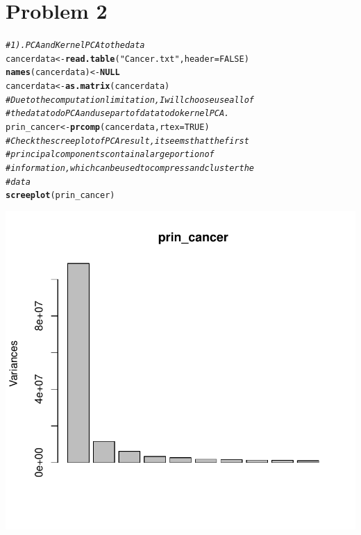 \documentclass{article}\usepackage[]{graphicx}\usepackage[]{color}
\makeatletter
\def\maxwidth{ %
  \ifdim\Gin@nat@width>\linewidth
    \linewidth
  \else
    \Gin@nat@width
  \fi
}
\newcommand{\hlnum}[1]{\textcolor[rgb]{0.686,0.059,0.569}{#1}}%
\newcommand{\hlstr}[1]{\textcolor[rgb]{0.192,0.494,0.8}{#1}}%
\newcommand{\hlcom}[1]{\textcolor[rgb]{0.678,0.584,0.686}{\textit{#1}}}%
\newcommand{\hlstd}[1]{\textcolor[rgb]{0.345,0.345,0.345}{#1}}%
\newcommand{\hlkwa}[1]{\textcolor[rgb]{0.161,0.373,0.58}{\textbf{#1}}}%
\newcommand{\hlkwb}[1]{\textcolor[rgb]{0.69,0.353,0.396}{#1}}%
\newcommand{\hlkwc}[1]{\textcolor[rgb]{0.333,0.667,0.333}{#1}}%
\newcommand{\hlkwd}[1]{\textcolor[rgb]{0.737,0.353,0.396}{\textbf{#1}}}%
\newenvironment{kframe}{%
 \def\at@end@of@kframe{}%
 \ifinner\ifhmode%
  \def\at@end@of@kframe{\end{minipage}}%
  \begin{minipage}{\columnwidth}%
 \fi\fi%
 \def\FrameCommand##1{\hskip\@totalleftmargin \hskip-\fboxsep
 \colorbox{shadecolor}{##1}\hskip-\fboxsep
     \hskip-\linewidth \hskip-\@totalleftmargin \hskip\columnwidth}%
 \MakeFramed {\advance\hsize-\width
   \@totalleftmargin\z@ \linewidth\hsize
   \@setminipage}}%
 {\par\unskip\endMakeFramed%
 \at@end@of@kframe}
\newenvironment{knitrout}{}{} %
\makeatother
\begin{document}
\section*{Problem 2}

\begin{knitrout}
\color{fgcolor}\begin{kframe}
\begin{alltt}
\hlcom{# 1). PCA and Kernel PCA to the data}
\hlstd{cancerdata} \hlkwb{<-} \hlkwd{read.table}\hlstd{(}\hlstr{"Cancer.txt"}\hlstd{,} \hlkwc{header} \hlstd{=} \hlnum{FALSE}\hlstd{)}
\hlkwd{names}\hlstd{(cancerdata)} \hlkwb{<-} \hlkwa{NULL}
\hlstd{cancerdata} \hlkwb{<-} \hlkwd{as.matrix}\hlstd{(cancerdata)}
\hlcom{# Due to the computation limitation, I will choose use all of}
\hlcom{# the data to do PCA and use part of data to do kernel PCA.}
\hlstd{prin_cancer} \hlkwb{<-} \hlkwd{prcomp}\hlstd{(cancerdata,} \hlkwc{rtex} \hlstd{=} \hlnum{TRUE}\hlstd{)}
\hlcom{# Check the screeplot of PCA result, it seems that the first}
\hlcom{# principal components contain a large portion of}
\hlcom{# information, which can be used to compress and cluster the}
\hlcom{# data}
\hlkwd{screeplot}\hlstd{(prin_cancer)}
\end{alltt}
\end{kframe}

{\centering \includegraphics[width=\maxwidth]{figure/minimal-Problem_21} 

}
\end{knitrout}
\end{document}
